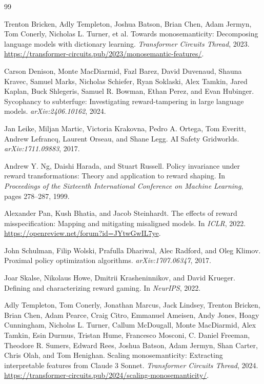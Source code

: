 \documentclass[11pt]{article}
\begin{document}
\begin{thebibliography}{99}

Trenton Bricken, Adly Templeton, Joshua Batson, Brian Chen, Adam Jermyn, Tom Conerly, Nicholas L. Turner, et al.
\newblock Towards monosemanticity: Decomposing language models with dictionary learning.
\newblock \emph{Transformer Circuits Thread}, 2023.
\newblock \url{https://transformer-circuits.pub/2023/monosemantic-features/}.

Carson Denison, Monte MacDiarmid, Fazl Barez, David Duvenaud, Shauna Kravec, Samuel Marks, Nicholas Schiefer, Ryan Soklaski, Alex Tamkin, Jared Kaplan, Buck Shlegeris, Samuel R. Bowman, Ethan Perez, and Evan Hubinger.
\newblock Sycophancy to subterfuge: Investigating reward-tampering in large language models.
\newblock \emph{arXiv:2406.10162}, 2024.

Jan Leike, Miljan Martic, Victoria Krakovna, Pedro A. Ortega, Tom Everitt, Andrew Lefrancq, Laurent Orseau, and Shane Legg.
\newblock AI Safety Gridworlds.
\newblock \emph{arXiv:1711.09883}, 2017.

Andrew Y. Ng, Daishi Harada, and Stuart Russell.
\newblock Policy invariance under reward transformations: Theory and application to reward shaping.
\newblock In \emph{Proceedings of the Sixteenth International Conference on Machine Learning}, pages 278--287, 1999.

Alexander Pan, Kush Bhatia, and Jacob Steinhardt.
\newblock The effects of reward misspecification: Mapping and mitigating misaligned models.
\newblock In \emph{ICLR}, 2022.
\newblock \url{https://openreview.net/forum?id=JYtwGwIL7ye}.

John Schulman, Filip Wolski, Prafulla Dhariwal, Alec Radford, and Oleg Klimov.
\newblock Proximal policy optimization algorithms.
\newblock \emph{arXiv:1707.06347}, 2017.

Joar Skalse, Nikolaus Howe, Dmitrii Krasheninnikov, and David Krueger.
\newblock Defining and characterizing reward gaming.
\newblock In \emph{NeurIPS}, 2022.

Adly Templeton, Tom Conerly, Jonathan Marcus, Jack Lindsey, Trenton Bricken, Brian Chen, Adam Pearce, Craig Citro, Emmanuel Ameisen, Andy Jones, Hoagy Cunningham, Nicholas L. Turner, Callum McDougall, Monte MacDiarmid, Alex Tamkin, Esin Durmus, Tristan Hume, Francesco Mosconi, C. Daniel Freeman, Theodore R. Sumers, Edward Rees, Joshua Batson, Adam Jermyn, Shan Carter, Chris Olah, and Tom Henighan.
\newblock Scaling monosemanticity: Extracting interpretable features from Claude 3 Sonnet.
\newblock \emph{Transformer Circuits Thread}, 2024.
\newblock \url{https://transformer-circuits.pub/2024/scaling-monosemanticity/}.


\end{thebibliography}
\end{document}
